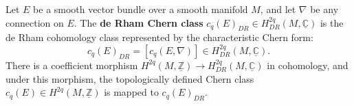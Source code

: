 Let $E$ be a smooth vector bundle over a smooth manifold $M$, and let $\nabla$ be any connection on $E$. The \textbf{de Rham Chern class} $c_q(E)_{DR} \in H^{2q}_{DR}(M, \underline{\mathbb{C}})$ is the de Rham cohomology class represented by the characteristic Chern form:
$$
c_q(E)_{DR} = [c_q(E, \nabla)] \in H^{2q}_{DR}(M, \underline{\mathbb{C}}).
$$
There is a coefficient morphism $H^{2q}(M, \underline{\mathbb{Z}}) \to H^{2q}_{DR}(M, \underline{\mathbb{C}})$ in cohomology, and under this morphism, the topologically defined Chern class $c_q(E) \in H^{2q}(M, \underline{\mathbb{Z}})$ is mapped to $c_q(E)_{DR}$.
